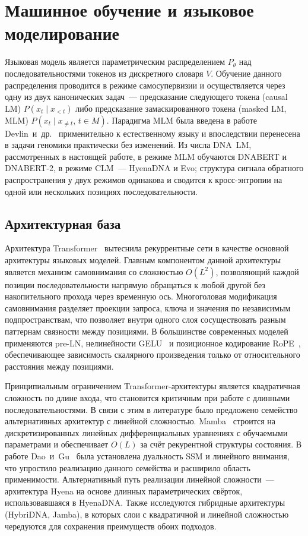 \section{Машинное обучение и языковое моделирование}

Языковая модель является параметрическим распределением $P_\theta$
над последовательностями токенов из дискретного словаря $V$. Обучение
данного распределения проводится в режиме самосупервизии и
осуществляется через одну из двух канонических задач~--- предсказание
следующего токена (causal LM) $P(x_t \mid x_{<t})$ либо предсказание
замаскированного токена (masked LM, MLM) $P(x_t \mid x_{\neq t},\, t
\in M)$. Парадигма MLM была введена в работе
Devlin~и~др.~\cite{devlinBERTPretrainingDeep2019} применительно к
естественному языку и впоследствии перенесена в задачи геномики
практически без изменений. Из числа DNA~LM, рассмотренных в настоящей
работе, в режиме MLM обучаются DNABERT и DNABERT-2, в режиме CLM~---
HyenaDNA и Evo; структура сигнала обратного распространения у двух
режимов одинакова и сводится к кросс-энтропии на одной или нескольких
позициях последовательности.

\subsection{Архитектурная база}

Архитектура Transformer~\cite{vaswaniAttentionAllYou2017} вытеснила
рекуррентные сети в качестве основной архитектуры языковых моделей.
Главным компонентом данной архитектуры является механизм
самовнимания со сложностью $O(L^2)$, позволяющий каждой позиции
последовательности напрямую обращаться к любой другой без
накопительного прохода через временную ось. Многоголовая модификация
самовнимания разделяет проекции запроса, ключа и значения по
независимым подпространствам, что позволяет внутри одного слоя
сосуществовать разным паттернам связности между позициями. В
большинстве современных моделей применяются pre-LN, нелинейности
GELU~\cite{hendrycksGaussianErrorLinear2016} и позиционное
кодирование RoPE~\cite{suRoFormerEnhancedTransformer2021},
обеспечивающее зависимость скалярного произведения только от
относительного расстояния между позициями.

Принципиальным ограничением Transformer-архитектуры является
квадратичная сложность по длине входа, что становится критичным при
работе с длинными последовательностями. В связи с этим в литературе
было предложено семейство альтернативных архитектур с линейной
сложностью. Mamba~\cite{guMambaLinearTimeSequence2023} строится на
дискретизированных линейных дифференциальных уравнениях с обучаемыми
параметрами и обеспечивает $O(L)$ за счёт рекурентной структуры
состояния. В работе Dao~и~Gu~\cite{daoTransformersAreSSMs2024} была
установлена дуальность SSM и линейного внимания, что упростило
реализацию данного семейства и расширило область применимости.
Альтернативный путь реализации линейной сложности~--- архитектура
Hyena на основе длинных параметрических свёрток, использовавшаяся в
HyenaDNA. Также исследуются гибридные архитектуры (HybriDNA, Jamba),
в которых слои с квадратичной и линейной сложностью чередуются для
сохранения преимуществ обоих подходов.

